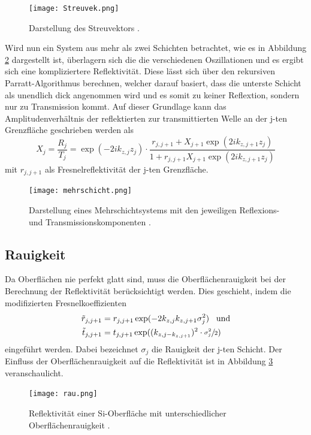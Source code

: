 \begin{figure}
  \centering
  \texttt{[image: Streuvek.png]}
  \caption{Darstellung des Streuvektors \cite{XSR}.}
  \label{fig:Streuvek}
\end{figure}


Wird nun ein System aus mehr als zwei Schichten betrachtet, wie es in Abbildung \ref{fig:mehrschicht} dargestellt ist, überlagern
sich die die verschiedenen Oszillationen und es ergibt sich eine kompliziertere Reflektivität. Diese lässt sich über den rekursiven
Parratt-Algorithmus berechnen, welcher darauf basiert, dass die unterste Schicht als unendlich dick angenommen wird und es somit zu keiner
Reflextion, sondern nur zu Transmission kommt.
Auf dieser Grundlage kann das Amplitudenverhältnis der reflektierten zur transmittierten Welle an der j-ten Grenzfläche geschrieben werden als
\begin{equation}
  X_j=\frac{R_j}{T_j}=\exp(-2ik_{z,j}z_j)\cdot\frac{r_{j,j+1}+X_{j+1}\exp(2ik_{z,j+1}z_j)}{1+r_{j,j+1}X_{j+1}\exp(2ik_{z,j+1}z_j)}
  \label{eqn:parratt}
\end{equation}
mit $r_{j,j+1}$ als Fresnelreflektivität der j-ten Grenzfläche.

\begin{figure}[H]
  \centering
  \texttt{[image: mehrschicht.png]}
  \caption{Darstellung eines Mehrschichtsystems mit den jeweiligen Reflexions- und Transmissionskomponenten \cite{skript}.}
  \label{fig:mehrschicht}
\end{figure}

\subsection{Rauigkeit}
Da Oberflächen nie perfekt glatt sind, muss die Oberflächenrauigkeit bei der Berechnung der Reflektivität berücksichtigt werden. Dies
geschieht, indem die modifizierten Fresnelkoeffizienten
\begin{align}
  \tilde{r}_{j,j+1}&=r_{j,j+1}\exp(-2k_{z,j}k_{z,j+1}\sigma^2_j)\;\;\;\text{und}\\
  \tilde{t}_{j,j+1}&=t_{j,j+1}\exp((k_{z,j-k_{z,j+1}})^2\cdot\sfrac{\sigma^2_j}{2})
\end{align}
eingeführt werden. Dabei bezeichnet $\sigma_j$ die Rauigkeit der j-ten Schicht.
Der Einfluss der Oberflächenrauigkeit auf die Reflektivität ist in Abbildung \ref{fig:rau} veranschaulicht.

\begin{figure}
  \centering
  \texttt{[image: rau.png]}
  \caption{Reflektivität einer Si-Oberfläche mit unterschiedlicher Oberflächenrauigkeit \cite{XSR}.}
  \label{fig:rau}
\end{figure}


